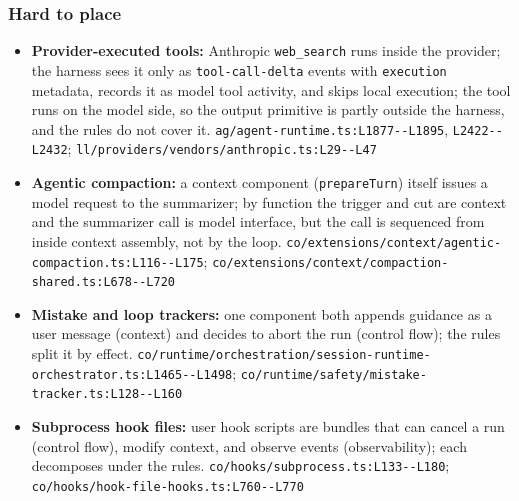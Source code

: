\subsubsection*{Hard to place}
\begin{itemize}
\item \textbf{Provider-executed tools:} Anthropic \texttt{web\_\allowbreak{}search} runs inside the provider; the harness sees it only as \texttt{tool-\allowbreak{}call-\allowbreak{}delta} events with \texttt{execution} metadata, records it as model tool activity, and skips local execution; the tool runs on the model side, so the output primitive is partly outside the harness, and the rules do not cover it. \texttt{ag/\allowbreak{}agent-\allowbreak{}runtime.\allowbreak{}ts:\allowbreak{}L1877-\allowbreak{}-\allowbreak{}L1895}, \texttt{L2422-\allowbreak{}-\allowbreak{}L2432}; \texttt{ll/\allowbreak{}providers/\allowbreak{}vendors/\allowbreak{}anthropic.\allowbreak{}ts:\allowbreak{}L29-\allowbreak{}-\allowbreak{}L47}
\item \textbf{Agentic compaction:} a context component (\texttt{prepareTurn}) itself issues a model request to the summarizer; by function the trigger and cut are context and the summarizer call is model interface, but the call is sequenced from inside context assembly, not by the loop. \texttt{co/\allowbreak{}extensions/\allowbreak{}context/\allowbreak{}agentic-\allowbreak{}compaction.\allowbreak{}ts:\allowbreak{}L116-\allowbreak{}-\allowbreak{}L175}; \texttt{co/\allowbreak{}extensions/\allowbreak{}context/\allowbreak{}compaction-\allowbreak{}shared.\allowbreak{}ts:\allowbreak{}L678-\allowbreak{}-\allowbreak{}L720}
\item \textbf{Mistake and loop trackers:} one component both appends guidance as a user message (context) and decides to abort the run (control flow); the rules split it by effect. \texttt{co/\allowbreak{}runtime/\allowbreak{}orchestration/\allowbreak{}session-\allowbreak{}runtime-\allowbreak{}orchestrator.\allowbreak{}ts:\allowbreak{}L1465-\allowbreak{}-\allowbreak{}L1498}; \texttt{co/\allowbreak{}runtime/\allowbreak{}safety/\allowbreak{}mistake-\allowbreak{}tracker.\allowbreak{}ts:\allowbreak{}L128-\allowbreak{}-\allowbreak{}L160}
\item \textbf{Subprocess hook files:} user hook scripts are bundles that can cancel a run (control flow), modify context, and observe events (observability); each decomposes under the rules. \texttt{co/\allowbreak{}hooks/\allowbreak{}subprocess.\allowbreak{}ts:\allowbreak{}L133-\allowbreak{}-\allowbreak{}L180}; \texttt{co/\allowbreak{}hooks/\allowbreak{}hook-\allowbreak{}file-\allowbreak{}hooks.\allowbreak{}ts:\allowbreak{}L760-\allowbreak{}-\allowbreak{}L770}
\end{itemize}

